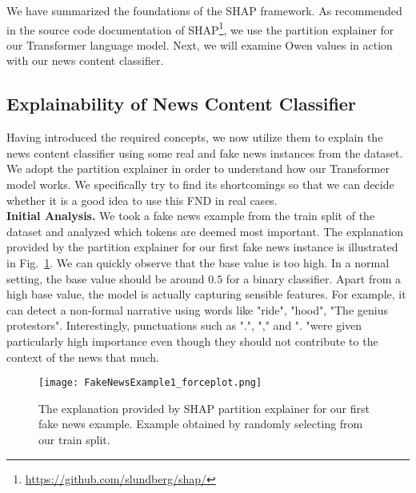 We have summarized the foundations of the SHAP framework. As recommended in the source code documentation of SHAP\footnote{\url{https://github.com/slundberg/shap/}}, we use the partition explainer for our Transformer language model. Next, we will examine Owen values in action with our news content classifier.

\subsection{Explainability of News Content Classifier}
\label{subsec:ExplainingNewsContentModels_ExplainingNewsContentClassifier}
Having introduced the required concepts, we now utilize them to explain the news content classifier using some real and fake news instances from the dataset. We adopt the partition explainer in order to understand how our Transformer model works. We specifically try to find its shortcomings so that we can decide whether it is a good idea to use this FND in real cases.\\
\textbf{Initial Analysis.} We took a fake news example from the train split of the dataset and analyzed which tokens are deemed most important. The explanation provided by the partition explainer for our first fake news instance is illustrated in Fig.~\ref{fig:FakeNewsExample1_forceplot}. We can quickly observe that the base value is too high. In a normal setting, the base value should be around $0.5$ for a binary classifier. Apart from a high base value, the model is actually capturing sensible features. For example, it can detect a non-formal narrative using words like "ride", "hood", "The genius protestors".  Interestingly, punctuations such as ".", "," and ". "were given particularly high importance even though they should not contribute to the context of the news that much.\\
\begin{figure}
    \centering
    \texttt{[image: FakeNewsExample1\_forceplot.png]}
    \caption[The explanation provided by SHAP partition explainer for our first fake news example.]{The explanation provided by SHAP partition explainer for our first fake news example. Example obtained by randomly selecting from our train split.}
    \label{fig:FakeNewsExample1_forceplot}
\end{figure}
